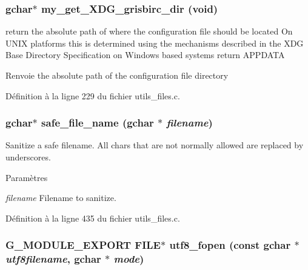 \subsubsection[{my\_\-get\_\-XDG\_\-grisbirc\_\-dir}]{\setlength{\rightskip}{0pt plus 5cm}gchar$\ast$ my\_\-get\_\-XDG\_\-grisbirc\_\-dir (void)}\label{utils__files_8c_a1794f2646f6aa227df941dfd0f63b9b4}
return the absolute path of where the configuration file should be located On UNIX platforms this is determined using the mechanisms described in the XDG Base Directory Specification on Windows based systems return APPDATA

\begin{DoxyReturn}{Renvoie}
the absolute path of the configuration file directory 
\end{DoxyReturn}


Définition à la ligne 229 du fichier utils\_\-files.c.

\subsubsection[{safe\_\-file\_\-name}]{\setlength{\rightskip}{0pt plus 5cm}gchar$\ast$ safe\_\-file\_\-name (gchar $\ast$ {\em filename})}\label{utils__files_8c_a3a57f67068b5f1274d722eac4cd5a9e6}
Sanitize a safe filename. All chars that are not normally allowed are replaced by underscores.


\begin{DoxyParams}{Paramètres}
\item[{\em filename}]Filename to sanitize. \end{DoxyParams}


Définition à la ligne 435 du fichier utils\_\-files.c.

\subsubsection[{utf8\_\-fopen}]{\setlength{\rightskip}{0pt plus 5cm}G\_\-MODULE\_\-EXPORT FILE$\ast$ utf8\_\-fopen (const gchar $\ast$ {\em utf8filename}, \/  gchar $\ast$ {\em mode})}\label{utils__files_8c_ac113fb5932da8fd819f73d967a90c219}


